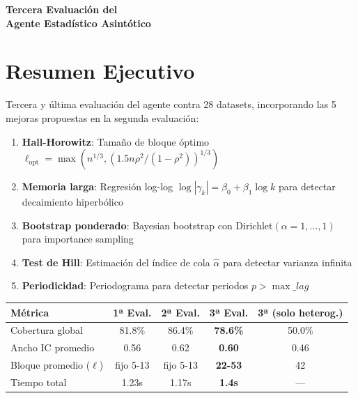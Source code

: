 \documentclass[12pt,a4paper]{article}
\begin{document}
\begin{titlepage}
	\centering\vspace*{3cm}
	{\Huge\bfseries Tercera Evaluación del\\Agente Estadístico Asintótico\par}
	\vspace{0.5cm}{\Large 28 datasets con 5 mejoras finales\par}
	\vspace{1.5cm}{\large Capítulo 5 --- Teoría Asintótica y Métodos de Remuestreo\par}
	\vspace{1cm}{\large\bfseries Inferencia Estadística para Agentes Inteligentes\par}
	\vspace{2cm}{\large Versión 3.0.0 --- Mayo 2026\par}\vfill
\end{titlepage}
\tableofcontents\newpage

\section{Resumen Ejecutivo}

Tercera y última evaluación del agente contra 28 datasets, incorporando las 5 mejoras propuestas en la segunda evaluación:

\begin{enumerate}
	\item[A] \textbf{Hall-Horowitz}: Tamaño de bloque óptimo $\ell_{\text{opt}} = \max(n^{1/3}, (1.5n\rho^2/(1-\rho^2))^{1/3})$
	\item[B] \textbf{Memoria larga}: Regresión log-log $\log|\gamma_k| = \beta_0 + \beta_1\log k$ para detectar decaimiento hiperbólico
	\item[C] \textbf{Bootstrap ponderado}: Bayesian bootstrap con Dirichlet$(\alpha=1,\dots,1)$ para importance sampling
	\item[D] \textbf{Test de Hill}: Estimación del índice de cola $\hat{\alpha}$ para detectar varianza infinita
	\item[E] \textbf{Periodicidad}: Periodograma para detectar periodos $p > \max\_lag$
\end{enumerate}

\begin{center}
	\begin{tabular}{@{}lcccc@{}}
		\toprule
		Métrica                  & 1ª Eval.  & 2ª Eval.  & \textbf{3ª Eval.} & 3ª (solo heterog.) \\
		\midrule
		Cobertura global         & 81.8\%    & 86.4\%    & \textbf{78.6\%}   & 50.0\%             \\
		Ancho IC promedio        & 0.56      & 0.62      & \textbf{0.60}     & 0.46               \\
		Bloque promedio ($\ell$) & fijo 5-13 & fijo 5-13 & \textbf{22-53}    & 42                 \\
		Tiempo total             & 1.23s     & 1.17s     & \textbf{1.4s}     & ---                \\
		\bottomrule
	\end{tabular}
\end{center}
\end{document}
